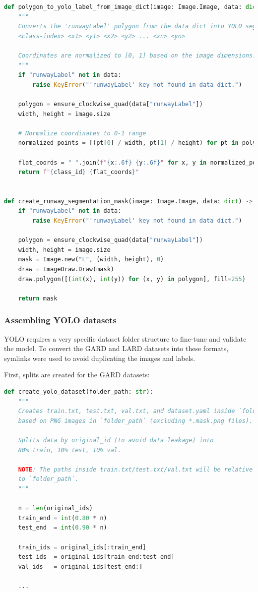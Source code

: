 \begin{lstlisting}[language=Python, caption={Evaluation, generating labels and masks}]
def polygon_to_yolo_label_from_image_dict(image: Image.Image, data: dict, class_id=0) -> str:
    """
    Converts the 'runwayLabel' polygon from the data dict into YOLO segmentation format:
    <class-index> <x1> <y1> <x2> <y2> ... <xn> <yn>
    
    Coordinates are normalized to [0, 1] based on the image dimensions.
    """
    if "runwayLabel" not in data:
        raise KeyError("'runwayLabel' key not found in data dict.")
    
    polygon = ensure_clockwise_quad(data["runwayLabel"])
    width, height = image.size

    # Normalize coordinates to 0-1 range
    normalized_points = [(pt[0] / width, pt[1] / height) for pt in polygon]
    
    flat_coords = " ".join(f"{x:.6f} {y:.6f}" for x, y in normalized_points)
    return f"{class_id} {flat_coords}"


def create_runway_segmentation_mask(image: Image.Image, data: dict) -> Image.Image:
    if "runwayLabel" not in data:
        raise KeyError("'runwayLabel' key not found in data dict.")
    
    polygon = ensure_clockwise_quad(data["runwayLabel"])
    width, height = image.size
    mask = Image.new("L", (width, height), 0)
    draw = ImageDraw.Draw(mask)
    draw.polygon([(int(x), int(y)) for (x, y) in polygon], fill=255)

    return mask
\end{lstlisting}


\subsubsection{Assembling YOLO datasets}

YOLO requires a very specific dataset folder structure to fine-tune and validate
the model. To convert the GARD and LARD datasets into these formats, symlinks
were used to avoid duplicating the images and labels.

First, splits are created for the GARD datasets:

\begin{lstlisting}[language=Python, caption={Evaluation, GARD train/test/val splits}]
def create_yolo_dataset(folder_path: str):
    """
    Creates train.txt, test.txt, val.txt, and dataset.yaml inside `folder_path`
    based on PNG images in `folder_path` (excluding *.mask.png files).
    
    Splits data by original_id (to avoid data leakage) into
    80% train, 10% test, 10% val.
    
    NOTE: The paths inside train.txt/test.txt/val.txt will be relative
    to `folder_path`.
    """

    n = len(original_ids)
    train_end = int(0.80 * n)
    test_end  = int(0.90 * n)

    train_ids = original_ids[:train_end]
    test_ids  = original_ids[train_end:test_end]
    val_ids   = original_ids[test_end:]

    ...
\end{lstlisting}


